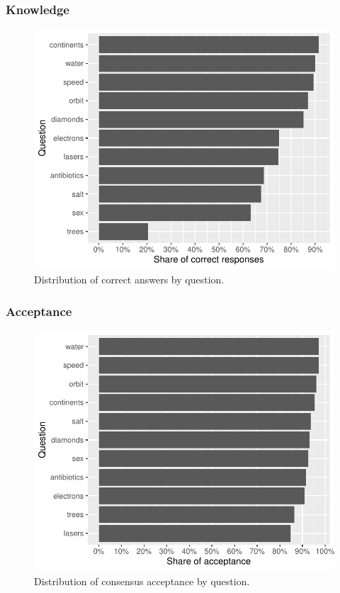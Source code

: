 \documentclass[
  doc,floatsintext]{apa6}
\begin{document}
\subsubsection{Knowledge}\label{knowledge}



\begin{figure}
\centering
\includegraphics{output/figures/exp1-questions-knowledge.pdf}
\caption{\label{fig:exp1-questions-knowledge}Distribution of correct answers by question.}
\end{figure}

\subsubsection{Acceptance}\label{acceptance}



\begin{figure}
\centering
\includegraphics{output/figures/exp1-questions-acceptance.pdf}
\caption{\label{fig:exp1-questions-acceptance}Distribution of consensus acceptance by question.}
\end{figure}
\end{document}
